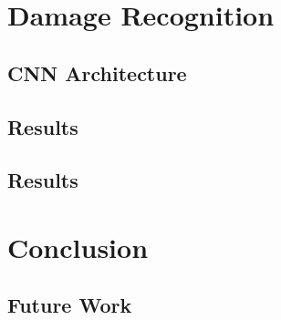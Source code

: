 \documentclass[a4paper,12pt]{report}
\begin{document}
\chapter{Damage Recognition}
    \section{CNN Architecture}

    \section{Results}


    \section{Results}


\FloatBarrier


\chapter{Conclusion}
    \section{Future Work}


% 
\end{document}
